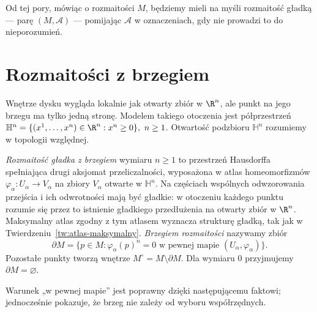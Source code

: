 Od tej pory, mówiąc o rozmaitości $M$, będziemy mieli na myśli rozmaitość gładką — parę
$(M,\mathcal{A})$ — pomijając $\mathcal{A}$ w oznaczeniach, gdy nie prowadzi to do
nieporozumień.

\section{Rozmaitości z brzegiem}
\label{sec:rozmaitosci-z-brzegiem-1}

Wnętrze dysku wygląda lokalnie jak otwarty zbiór w $\R^n$,
ale punkt na jego brzegu ma tylko jedną stronę. Modelem takiego
otoczenia jest półprzestrzeń $\mathbb H^n=\{(x^1,\ldots,x^n)\in\R^n:x^n\geq0\}, \ n\geq1$.
Otwartość podzbioru $\mathbb H^n$ rozumiemy w topologii względnej.

\begin{definicja}
\label{def:rozmaitosc-z-brzegiem-1}
\emph{Rozmaitość gładka z brzegiem} wymiaru $n\geq1$ to przestrzeń
Hausdorffa spełniająca drugi aksjomat przeliczalności, wyposażona
w atlas homeomorfizmów
$\varphi_\alpha:U_\alpha\to V_\alpha$ na zbiory
$V_\alpha$ otwarte w $\mathbb H^n$. Na częściach wspólnych
odwzorowania przejścia i ich odwrotności mają być gładkie:
w otoczeniu każdego punktu rozumie się przez to istnienie
gładkiego przedłużenia na otwarty zbiór w $\R^n$.
Maksymalny atlas zgodny z tym atlasem wyznacza strukturę gładką,
tak jak w Twierdzeniu~\ref{tw:atlas-maksymalny}.
\emph{Brzegiem rozmaitości} nazywamy zbiór
\[
 \partial M=\{p\in M:\varphi_\alpha(p)^n=0
             \text{ w pewnej mapie }(U_\alpha,\varphi_\alpha)\}.
\]
Pozostałe punkty tworzą wnętrze $M^\circ=M\setminus\partial M$.
Dla wymiaru $0$ przyjmujemy $\partial M=\varnothing$.
\end{definicja}

Warunek „w pewnej mapie” jest poprawny dzięki następującemu
faktowi; jednocześnie pokazuje, że brzeg nie zależy od wyboru
współrzędnych.

